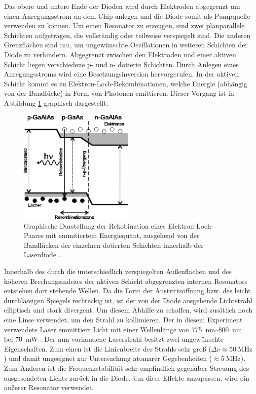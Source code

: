 Das obere und untere Ende der Dioden wird durch Elektroden abgegrenzt um einen
Anregungsstrom an dem Chip anlegen und die Diode somit als Pumpquelle verwenden zu
können. Um einen Resonator zu erzeugen, sind zwei planparallele Schichten
aufgetragen, die vollständig oder teilweise verspiegelt sind. Die anderen
Grenzflächen sind rau, um ungewünschte Oszillationen in weiteren Schichten der
Diode zu verhindern. Abgegrenzt zwischen den Elektroden und einer aktiven Schicht
liegen verschiedene p- und n- dotierte Schichten. Durch Anlegen eines
Anregungsstroms wird eine Besetzungsinversion hervorgerufen. In der aktiven
Schicht kommt es zu Elektron-Loch-Rekombinationen, welche Energie (abhängig von der
Bandlücke) in Form von Photonen emittieren. Dieser Vorgang ist in Abbildung
\ref{fig:recombition} graphisch dargestellt.
\begin{figure}[htb]
  \centering
  \includegraphics[width=0.5\textwidth]{images/recombition.pdf}
  \caption{Graphische Darstellung der Rekobination eines Elektron-Loch-Paares mit
  emmitiertem Energiequant, ausgehend von der Bandlücken der einzelnen dotierten
  Schichten innerhalb der Laserdiode \cite{recomb}.}
  \label{fig:recombition}
\end{figure}

Innerhalb des durch die unterschiedlich
verspiegelten Außenflächen und des höheren Brechungsindezes der aktiven Schicht
abgegrenzten internen Resonators entstehen dort stehende Wellen. Da die Form
der Austrittsöffnung bzw. des leicht durchlässigen Spiegels rechteckig ist, ist der
von der Diode ausgehende Lichtstrahl elliptisch und stark divergent. Um diesem
Abhilfe zu schaffen, wird zusätlich noch eine Linse verwendet, um den Strahl zu
kollimieren.
Der in diesem Experiment verwendete Laser emmittiert Licht
mit einer Wellenlänge von \SIrange{775}{800}{\nano\meter} bei \SI{70}{\milli\watt}
\cite{Sanyo}.
Der nun vorhandene Laserstrahl besitzt zwei ungewünschte Eigenschaften. Zum einen
ist die Linienbreite des Strahls sehr groß ($\Delta\nu \approx \SI{50}{\mega\hertz}$)
und damit ungeeignet zur Untersuchung atomarer Gegebenheiten ($ \approx \SI{5}{\mega\hertz}$).
Zum Anderen ist die Frequenzstabilität sehr empfindlich gegenüber
Streuung des ausgesendeten Lichts zurück in die Diode.
Um diese Effekte anzupassen, wird ein äußerer
Resonator verwendet.

